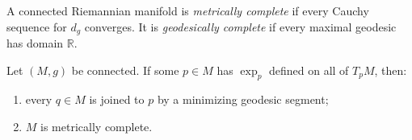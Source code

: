 A connected Riemannian manifold is \emph{metrically complete} if every Cauchy
sequence for $d_g$ converges. It is \emph{geodesically complete} if every
maximal geodesic has domain $\mathbb R$.

\begin{lemma}
\label{lem:exponential-map-implies-completeness}
\leanok
Let $(M,g)$ be connected. If some $p\in M$ has $\exp_p$ defined on all of
$T_pM$, then:
\begin{enumerate}
\item[(a)] every $q\in M$ is joined to $p$ by a minimizing geodesic segment;
\item[(b)] $M$ is metrically complete.
\end{enumerate}
\end{lemma}


